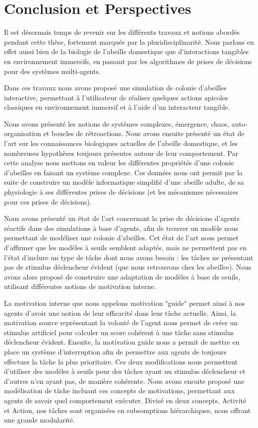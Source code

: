 \chapter*{Conclusion et Perspectives}

Il est désormais temps de revenir sur les différents travaux et notions abordés pendant cette thèse, fortement marquée par la pluridisciplinarité. Nous parlons en effet aussi bien de la biologie de l'abeille domestique que d'interactions tangibles en environnement immersifs, en passant par les algorithmes de prises de décisions pour des systèmes multi-agents.

Dans ces travaux nous avons proposé une simulation de colonie d'abeilles interactive, permettant à l'utilisateur de réaliser quelques actions apicoles classiques en environnement immersif et à l'aide d'un interacteur tangible.

Nous avons présenté les notions de systèmes complexes, émergence, chaos, auto-organisation et boucles de rétroactions. Nous avons ensuite présenté un état de l'art sur les connaissances biologiques actuelles de l'abeille domestique, et les nombreuses hypothèses toujours présentes autour de leur comportement. Par cette analyse nous mettons en valeur les différentes propriétés d'une colonie d'abeilles en faisant un système complexe. Ces données nous ont permit par la suite de construire un modèle informatique simplifié d'une abeille adulte, de sa physiologie à ses différentes prises de décisions (et les mécanismes nécessaires pour ces prises de décisions).

Nous avons présenté un état de l'art concernant la prise de décisions d'agents réactifs dans des simulations à base d'agents, afin de trouver un modèle nous permettant de modéliser une colonie d'abeilles. Cet état de l'art nous permet d'affirmer que les modèles à seuils semblent adaptés, mais ne permettent pas en l'état d'inclure un type de tâche dont nous avons besoin : les tâches ne présentant pas de stimulus déclencheur évident (que nous retrouvons chez les abeilles). Nous avons alors proposé de construire une adaptation de modèles à base de seuils, utilisant différentes notions de motivation interne.

La motivation interne que nous appelons motivation "guide" permet ainsi à nos agents d'avoir une notion de leur efficacité dans leur tâche actuelle. Ainsi, la motivation source représentant la volonté de l'agent nous permet de créer un stimulus artificiel pour calculer un score cohérent à une tâche sans stimulus déclencheur évident. Ensuite, la motivation guide nous a permit de mettre en place un système d'interruption afin de permettre aux agents de toujours effectuer la tâche la plus prioritaire. Ces deux modifications nous permettent d'utiliser des modèles à seuils pour des tâches ayant un stimulus déclencheur et d'autres n'en ayant pas, de manière cohérente. Nous avons ensuite proposé une modélisation de tâche incluant ces concepts de motivations, permettant aux agents de savoir quel comportement exécuter. Divisé en deux concepts, Activité et Action, nos tâches sont organisées en subsomptions hiérarchiques, nous offrant une grande modularité.

